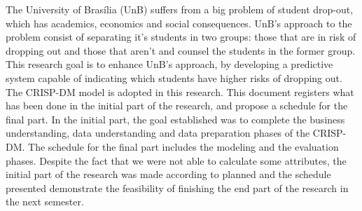 The University of Brasília (UnB) suffers from a big problem of student drop-out, which has
academics, economics and social consequences. UnB's approach to the problem consist
of separating it's students in two groups: those that are in risk of dropping out
and those that aren't and counsel the students in the former group. This research
goal is to enhance UnB's approach, by developing a predictive system capable of
indicating which students have higher risks of dropping out. The CRISP-DM model is
adopted in this research. 
This document registers what has been done in the initial part of the research, and
propose a schedule for the final part. In the initial part, the goal established was
to complete the business
understanding, data understanding and data preparation phases of the CRISP-DM. 
The schedule for the final part includes the modeling and the evaluation
phases.  
Despite the fact that we were not able to calculate some attributes, the initial
part of the research was made according to planned and the schedule presented
demonstrate the feasibility of finishing the end part of the research in the next
semester. 
